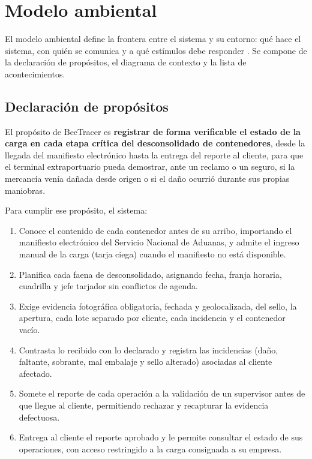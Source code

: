 \chapter{Modelo ambiental}
\label{cap:ambiental}

El modelo ambiental define la frontera entre el sistema y su entorno: qué hace el sistema,
con quién se comunica y a qué estímulos debe responder \parencite{yourdon1989}. Se compone de
la declaración de propósitos, el diagrama de contexto y la lista de acontecimientos.

\section{Declaración de propósitos}
\label{sec:propositos}

El propósito de BeeTracer es \textbf{registrar de forma verificable el estado de la carga en
cada etapa crítica del desconsolidado de contenedores}, desde la llegada del manifiesto
electrónico hasta la entrega del reporte al cliente, para que el terminal extraportuario pueda
demostrar, ante un reclamo o un seguro, si la mercancía venía dañada desde origen o si el
daño ocurrió durante sus propias maniobras.

Para cumplir ese propósito, el sistema:

\begin{enumerate}
    \item Conoce el contenido de cada contenedor antes de su arribo, importando el manifiesto
    electrónico del Servicio Nacional de Aduanas, y admite el ingreso manual de la carga
    (tarja ciega) cuando el manifiesto no está disponible.
    \item Planifica cada faena de desconsolidado, asignando fecha, franja horaria, cuadrilla y
    jefe tarjador sin conflictos de agenda.
    \item Exige evidencia fotográfica obligatoria, fechada y geolocalizada, del sello, la
    apertura, cada lote separado por cliente, cada incidencia y el contenedor vacío.
    \item Contrasta lo recibido con lo declarado y registra las incidencias (daño, faltante,
    sobrante, mal embalaje y sello alterado) asociadas al cliente afectado.
    \item Somete el reporte de cada operación a la validación de un supervisor antes de que
    llegue al cliente, permitiendo rechazar y recapturar la evidencia defectuosa.
    \item Entrega al cliente el reporte aprobado y le permite consultar el estado de sus
    operaciones, con acceso restringido a la carga consignada a su empresa.
\end{enumerate}

